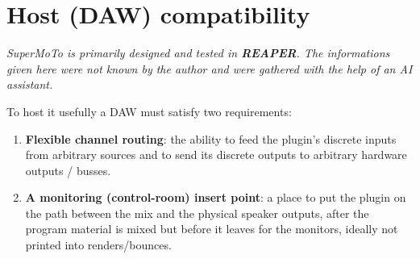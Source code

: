 \chapter{Host (DAW) compatibility}\label{ch:daw}

\emph{SuperMoTo is primarily designed and tested in \textbf{REAPER}. The informations given here were not known by the author and were gathered with the help of an AI assistant.}

To host it usefully a DAW must satisfy two requirements:

\begin{enumerate}[nosep]
  \item \textbf{Flexible channel routing}: the ability to feed the plugin's discrete inputs from arbitrary sources and to send its discrete outputs to arbitrary hardware outputs / busses.
  \item \textbf{A monitoring (control-room) insert point}: a place to put the plugin on the path between the mix and the physical speaker outputs, after the program material is mixed but before it leaves for the monitors, ideally not printed into renders/bounces.
\end{enumerate}

